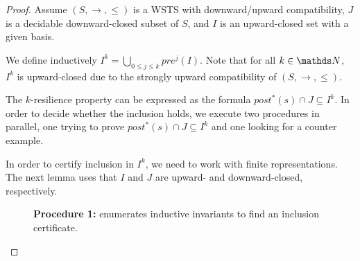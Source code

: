 \begin{proof}

Assume  $(S, \rightarrow, \leq)$ is a WSTS with downward/upward compatibility, $J$ is a decidable downward-closed subset of $S$, and $I$ is an upward-closed set with a given basis.

We define inductively
$I^{k} = \bigcup_{0 \leq j \leq k} pre^j(I)$. Note that for all $k \in \N$, $I^k$ is upward-closed due to
the strongly upward compatibility of $(S, \rightarrow, \leq)$.


The $k$-resilience property can be expressed as the formula
$ post^*(s) \cap J \subseteq I^k$. In order to decide whether the inclusion holds, we execute two procedures in parallel, one trying to prove $ post^*(s)\cap J \subseteq I^k$ 
and one looking for a counter example.

In order to certify inclusion in $I^k$, we need to work with finite representations.
The next lemma uses that $I$ and $J$ are upward- and downward-closed, respectively.









\begin{figure}
	\caption{\textbf{Procedure 1:} enumerates inductive invariants to find an inclusion certificate.}\label{procedure1}
\end{figure}





\end{proof}
